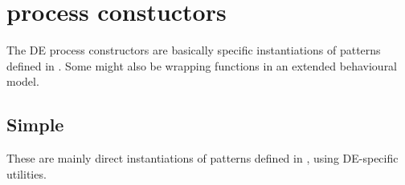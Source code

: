 \section{ process constuctors}
The DE process constructors are basically specific
 instantiations of patterns defined in . Some
 might also be wrapping functions in an extended behavioural
 model.\par

\subsection{Simple}
These are mainly direct instantiations of patterns defined in
 , using DE-specific utilities.\par

